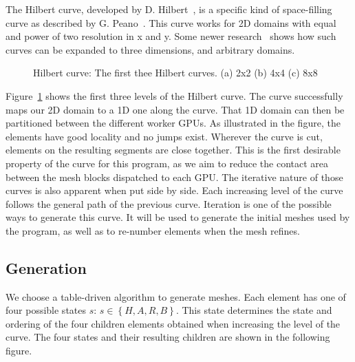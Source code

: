 The Hilbert curve, developed by D. Hilbert~\cite{Hilbert1891}, is a specific kind of space-filling
curve as described by G. Peano~\cite{Peano1890}. This curve works for 2D domains with equal and
power of two resolution in x and y. Some newer research~\cite{Haverkort2011} shows how such curves
can be expanded to three dimensions, and arbitrary domains.

\begin{figure}[H]
	\centering
	\hfill
	\hfill
	\caption{Hilbert curve: The first thee Hilbert curves. (a) 2x2 (b) 4x4 (c) 8x8}
	\label{fig:hilbert_curves}
\end{figure}

Figure~\ref{fig:hilbert_curves} shows the first three levels of the Hilbert curve. The curve
successfully maps our 2D domain to a 1D one along the curve. That 1D domain can then be partitioned
between the different worker GPUs. As illustrated in the figure, the elements have good locality and
no jumps exist. Wherever the curve is cut, elements on the resulting segments are close together.
This is the first desirable property of the curve for this program, as we aim to reduce the contact
area between the mesh blocks dispatched to each GPU. The iterative nature of those curves is also
apparent when put side by side. Each increasing level of the curve follows the general path of the
previous curve. Iteration is one of the possible ways to generate this curve. It will be used to
generate the initial meshes used by the program, as well as to re-number elements when the mesh
refines.

\subsection{Generation} \label{subsection:load_balancing:hilbert_curve:generation}

We choose a table-driven algorithm to generate meshes. Each element has one of four possible states
$s$: $s \in \left \{H, A, R, B \right \}$. This state determines the state and ordering of the four children
elements obtained when increasing the level of the curve. The four states and their resulting
children are shown in the following figure.

